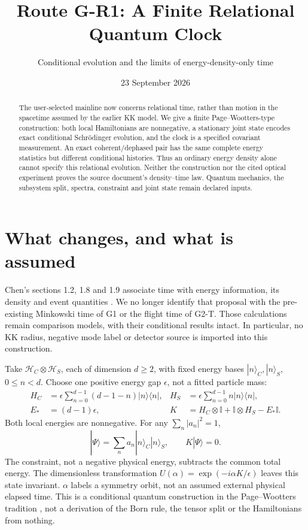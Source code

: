 \documentclass[11pt,a4paper]{article}
\title{Route G-R1: A Finite Relational Quantum Clock}
\author{Conditional evolution and the limits of energy-density-only time}
\date{23 September 2026}
\newcommand{\id}{\mathbb I}
\newcommand{\ket}[1]{|#1\rangle}
\newcommand{\bra}[1]{\langle#1|}
\begin{document}
\maketitle
\begin{abstract}
The user-selected mainline now concerns relational time, rather than
motion in the spacetime assumed by the earlier KK model. We give a
finite Page--Wootters-type construction: both local Hamiltonians are
nonnegative, a stationary joint state encodes exact conditional
Schr\"odinger evolution, and the clock is a specified covariant
measurement. An exact coherent/dephased pair has the same complete
energy statistics but different conditional histories. Thus an ordinary
energy density alone cannot specify this relational evolution.
Neither the construction nor the cited optical experiment proves the
source document's density--time law. Quantum mechanics, the subsystem
split, spectra, constraint and joint state remain declared inputs.
\end{abstract}

\section{What changes, and what is assumed}
Chen's sections 1.2, 1.8 and 1.9 associate time with energy information,
its density and event quantities \cite{chen}. We no longer identify that
proposal with the pre-existing Minkowski time of G1 or the flight time
of G2-T. Those calculations remain comparison models, with their
conditional results intact. In particular, no KK radius, negative mode
label or detector source is imported into this construction.

Take $\mathcal H_C\otimes\mathcal H_S$, each of dimension $d\geq2$,
with fixed energy bases $\ket n_C,\ket n_S$, $0\leq n<d$.
Choose one positive energy gap $\epsilon$, not a fitted particle mass:
\begin{align}
 H_C&=\epsilon\sum_{n=0}^{d-1}(d-1-n)\ket n\bra n,&
 H_S&=\epsilon\sum_{n=0}^{d-1}n\ket n\bra n,\\
 E_*&=(d-1)\epsilon,&
 K&=H_C\otimes\id+\id\otimes H_S-E_*\id .
\end{align}
Both local energies are nonnegative. For any $\sum_n|a_n|^2=1$,
\begin{equation}\label{eq:global}
 \ket\Psi=\sum_n a_n\ket n_C\ket n_S,\qquad K\ket\Psi=0 .
\end{equation}
The constraint, not a negative physical energy, subtracts the common
total energy. The dimensionless transformation
$U(\alpha)=\exp(-i\alpha K/\epsilon)$ leaves this state invariant.
$\alpha$ labels a symmetry orbit, not an assumed external physical
elapsed time. This is a conditional quantum construction in the
Page--Wootters tradition \cite{moreva,quantumtime}, not a derivation
of the Born rule, the tensor split or the Hamiltonians from nothing.
\end{document}
